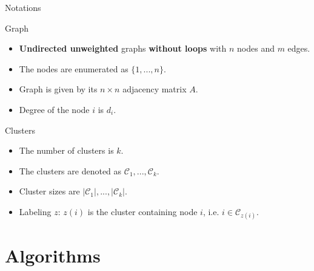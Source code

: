 \documentclass{beamer}
\theoremstyle{definition}
\theoremstyle{plain}
\theoremstyle{remark}
\begin{document}
			\begin{frame}{Notations}

			\vspace{-5pt}
			\begin{block}{Graph}
				\begin{itemize}
					\item \textbf{Undirected unweighted} graphs \textbf{without loops} with $n$ nodes and $m$ edges.
					\item The nodes are enumerated as $\{ 1, ..., n\}$.\\
					\item Graph is given by its $n \times n $ adjacency matrix $A$.
					\item Degree of the node $i$ is $d_i$. 
				\end{itemize}

			\end{block}

			\vspace{-5pt}
			\begin{block}{Clusters}
				\begin{itemize}
				\item The number of clusters is $k$.\\
				\item The clusters are denoted as $\mathcal{C}_1, ..., \mathcal{C}_k$.
				\item Cluster sizes are $ |\mathcal{C}_1|, ..., |\mathcal{C}_k|$.
				\item Labeling $z$: $z(i)$ is the cluster containing node $i$, i.e. $i \in \mathcal{C}_{z(i)}$.
				\end{itemize}
			\end{block}
		\end{frame}

	\section{Algorithms}
\end{document}
